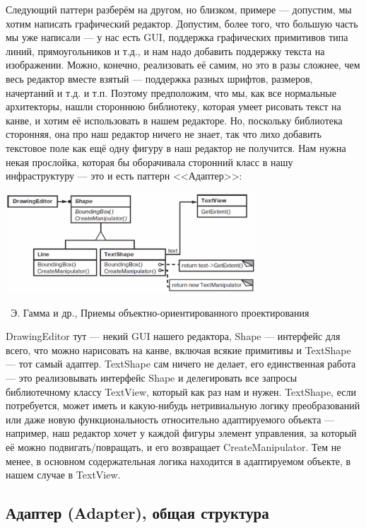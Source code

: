 \documentclass[a5paper]{article}
\newcommand{\attribution}[1] {
    \vspace{-5mm}\begin{flushright}\begin{scriptsize}%
    {\textcopyright\, #1}\end{scriptsize}\end{flushright}
}
\begin{document}
Следующий паттерн разберём на другом, но близком, примере --- допустим, мы хотим написать графический редактор. Допустим, более того, что большую часть мы уже написали --- у нас есть GUI, поддержка графических примитивов типа линий, прямоугольников и т.д., и нам надо добавить поддержку текста на изображении. Можно, конечно, реализовать её самим, но это в разы сложнее, чем весь редактор вместе взятый --- поддержка разных шрифтов, размеров, начертаний и т.д. и т.п. Поэтому предположим, что мы, как все нормальные архитекторы, нашли стороннюю библиотеку, которая умеет рисовать текст на канве, и хотим её использовать в нашем редакторе. Но, поскольку библиотека сторонняя, она про наш редактор ничего не знает, так что лихо добавить текстовое поле как ещё одну фигуру в наш редактор не получится. Нам нужна некая прослойка, которая бы оборачивала сторонний класс в нашу инфраструктуру --- это и есть паттерн <<Адаптер>>:

\begin{center}
    \includegraphics[width=0.7\textwidth]{adapterExample.png}
    \attribution{Э. Гамма и др., Приемы объектно-ориентированного проектирования}
\end{center}

DrawingEditor тут --- некий GUI нашего редактора, Shape --- интерфейс для всего, что можно нарисовать на канве, включая всякие примитивы и TextShape --- тот самый адаптер. TextShape сам ничего не делает, его единственная работа --- это реализовывать интерфейс Shape и делегировать все запросы библиотечному классу TextView, который как раз нам и нужен. TextShape, если потребуется, может иметь и какую-нибудь нетривиальную логику преобразований или даже новую функциональность относительно адаптируемого объекта --- например, наш редактор хочет у каждой фигуры элемент управления, за который её можно подвигать/повращать, и его возвращает CreateManipulator. Тем не менее, в основном содержательная логика находится в адаптируемом объекте, в нашем случае в TextView.

\subsection{Адаптер (Adapter), общая структура}
\end{document}
